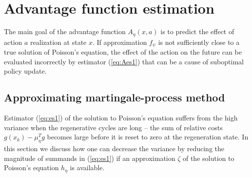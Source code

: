 \documentclass[11pt]{article}
\newcommand{\R}{\mathbb{R}}
\newcommand{\E}{\mathbb{E}}
\newcommand{\X}{\mathcal{X}}
\newcommand{\A}{\mathcal{A}}
\theoremstyle{definition}
\numberwithin{equation}{section}
\begin{document}
\section{Advantage function estimation}\label{sec:M1}



The main goal of the advantage function $A_{\eta} (x, a)$ is to predict the effect of action $a$ realization at state $x$. If approximation  $f_\psi$ is not sufficiently close to a true solution of  Poisson's equation, the effect of the action on the future can be evaluated incorrectly by estimator (\ref{eq:Aes1}) that can be a cause of suboptimal policy update.


%
%



\subsection{Approximating martingale-process method}

 



Estimator (\ref{eq:es1}) of  the solution to Poisson's equation suffers from the high variance when the regenerative cycles are long -- the sum of relative costs $g(x_k) - \mu_\eta^Tg$   becomes large before it is reset to zero at the regeneration state.   In this section we discuss how one can decrease  the variance by reducing the magnitude of summands in (\ref{eq:es1}) if  an approximation $\zeta$  of the solution to Poisson's equation $ h_\eta$ is available.
\end{document}
